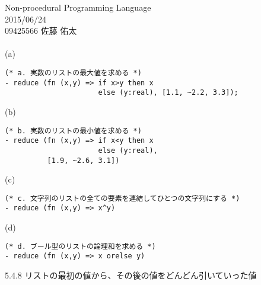 
\oddsidemargin  -5mm
\textwidth      170mm
\textheight     250mm
\topmargin      -20mm



Non-procedural Programming Language
\\
2015/06/24
\\
09425566
佐藤 佑太
\\
\\
(a)
\begin{verbatim}
(* a. 実数のリストの最大値を求める *)
- reduce (fn (x,y) => if x>y then x 
                      else (y:real), [1.1, ~2.2, 3.3]);
\end{verbatim}


(b)
\begin{verbatim}
(* b. 実数のリストの最小値を求める *)
- reduce (fn (x,y) => if x<y then x
                      else (y:real), 
          [1.9, ~2.6, 3.1])
\end{verbatim}


(c)
\begin{verbatim}
(* c. 文字列のリストの全ての要素を連結してひとつの文字列にする *)
- reduce (fn (x,y) => x^y)
\end{verbatim}

(d)
\begin{verbatim}
(* d. ブール型のリストの論理和を求める *)
- reduce (fn (x,y) => x orelse y)
\end{verbatim}

5.4.8 
リストの最初の値から、その後の値をどんどん引いていった値



